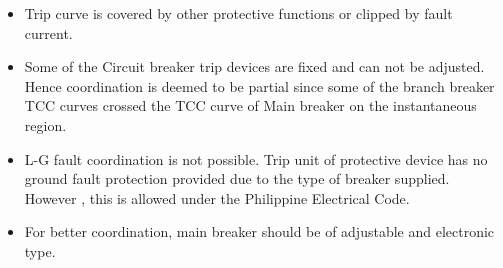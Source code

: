 \begin{itemize}
\item Trip curve is covered by other protective functions or clipped by fault current.

\item Some of the Circuit breaker trip devices are fixed and can not be adjusted. Hence coordination is deemed to be partial since some of the  branch breaker TCC curves crossed the TCC curve of Main breaker on the instantaneous region.

\item L-G fault coordination is not possible. Trip unit of protective device has no ground fault protection provided due to the type of breaker supplied. However , this is allowed under the Philippine Electrical Code.

\item For better coordination, main breaker should be of adjustable and electronic type.


\end{itemize}


